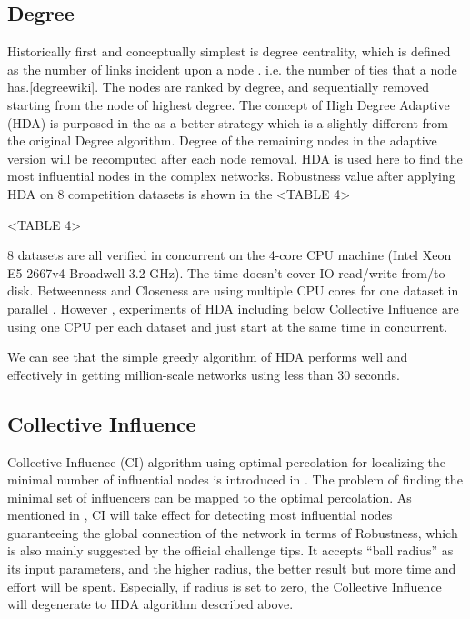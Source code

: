 \documentclass{article}
\begin{document}
	\subsection{Degree}		

	Historically first and conceptually simplest is degree centrality, which is defined as the number of links incident upon a node . i.e. the number of ties that a node has.[degreewiki]. The nodes are ranked by degree, and sequentially removed starting from the node of highest degree. The concept of High Degree Adaptive (HDA) is purposed in the \cite{morone2015influence} as a better strategy which is a slightly different from the original Degree algorithm. Degree of the remaining nodes in the adaptive version will be recomputed after each node removal. HDA is used here to find the most influential nodes in the complex networks. Robustness value after applying HDA on 8 competition datasets is shown in the <TABLE 4>
	
	<TABLE 4>
	
	8 datasets are all verified in concurrent on the 4-core CPU machine (Intel Xeon E5-2667v4 Broadwell 3.2 GHz). The time doesn't cover IO read/write from/to disk. Betweenness and Closeness are using multiple CPU cores for one dataset in parallel . However , experiments of HDA including below Collective Influence are using one CPU per each dataset and just start at the same time in concurrent.
	
	We can see that the simple greedy algorithm of HDA performs well and effectively in getting million-scale networks using less than 30 seconds. 


	\subsection{Collective Influence}		

	Collective Influence (CI) algorithm using optimal percolation for localizing the minimal number of influential nodes is introduced in \cite{morone2015influence} \cite{morone2016collective}. The problem of finding the minimal set of influencers can be mapped to the optimal percolation. As mentioned in \cite{lu2016vital}, CI will take effect for detecting most influential nodes guaranteeing the global connection of the network in terms of Robustness, which is also mainly suggested by the official challenge tips. It accepts “ball radius” as its input parameters, and the higher radius, the better result but more time and effort will be spent. Especially, if radius is set to zero, the Collective Influence will degenerate to HDA algorithm described above.
	
\end{document}
